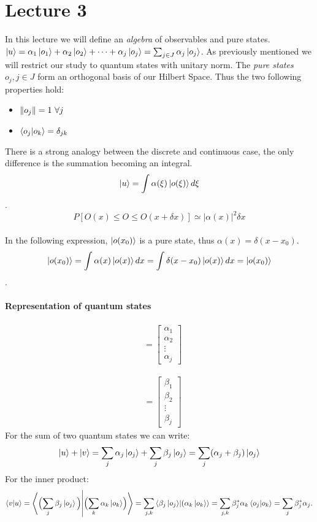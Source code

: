\documentclass{article}
\begin{document}
\section{Lecture 3}

In this lecture we will define an \emph{algebra} of observables and pure states.\\
$\ket{u} = \alpha_1 \ket{o_1} + \alpha_2 \ket{o_2} + \dots + \alpha_j\ket{o_j} = \sum_{j \in J} \alpha_j \ket{o_j}$.
As previously mentioned we will restrict our study to quantum states with unitary norm.
The \emph{pure states} $o_j, j \in J$ form an orthogonal basis of our Hilbert Space. Thus the two following properties hold:

\begin{itemize}
    \item $ \norm{o_j} = 1 \ \forall j$
    \item $\bra{o_j}\ket{o_k} = \delta_{jk}$
\end{itemize}
There is a strong analogy between the discrete and continuous case, the only difference is the summation becoming an integral. \\
$$ \ket{u} = \int \alpha(\xi)\ket{o(\xi)} d \xi $$. \\ 
$$P[O(x) \leq O \leq O(x+\delta x)] \simeq  |\alpha(x)|^2 \delta x$$ \\ 
In the following expression, $ \ket{o(x_0)}$ is a pure state, thus $\alpha(x) = \delta(x-x_0)$. \\
$$\ket{o(x_0)} = \int \alpha(x) \ket{o(x)} dx = \int \delta(x-x_0) \ket{o(x)} dx = \ket{o(x_0)} $$.
\paragraph{Representation of quantum states}

   \begin{align*}
    [\mathrm{A_j}] &= \begin{bmatrix}
           \alpha_1 \\
           \alpha_2  \\
           \vdots \\
           \alpha_j
         \end{bmatrix}
  \end{align*}

  \begin{align*}
    [\mathrm{B_j}] &= \begin{bmatrix}
           \beta_1 \\
           \beta_2  \\
           \vdots \\
           \beta_j
         \end{bmatrix}
  \end{align*}
For the sum of two quantum states we can write:
$$\ket{u} + \ket{v} = \sum_{j} \alpha_j \ket{o_j} + \sum_{j} \beta_j \ket{o_j} = \sum_{j}(\alpha_j + \beta_j) \ket{o_j}  $$
For the inner product:
  $$\bra{v}\ket{u} = \bra{ \Bigl( \sum_j \beta_j \ket{o_j} \Bigl) }\ket{ \Bigl( \sum_k{\alpha_k \ket{o_k}} \Bigl) } = \sum_{j,k} \bra{\beta_j \ket{o_j}} \ket{(\alpha_k \ket{o_k}} = \sum_{j,k} \beta^*_j \alpha_k \bra{o_j} \ket{o_k} = \sum_j \beta_j^* \alpha_j.$$
\end{document}
